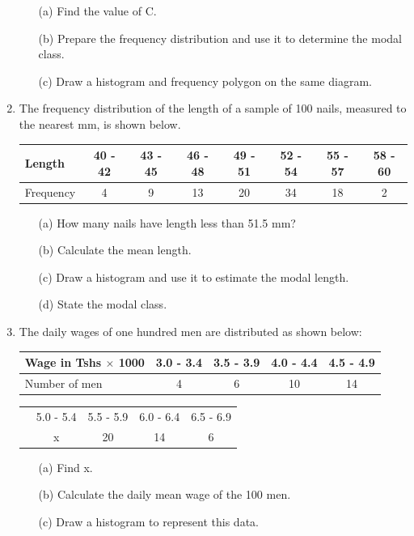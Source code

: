 \begin{enumerate}
	\begin{itemize}
	\item[(a)] Find the value of C.
	\item[(b)] Prepare the frequency distribution and use it to determine the modal class.
	\item[(c)] Draw a histogram and frequency polygon on the same diagram.
	\end{itemize}
	
	\item The frequency distribution of the length of a sample of 100 nails, measured to the nearest mm, is shown below.\\
	
	\begin{tabular}{|l|c|c|c|c|c|c|c|} \hline
	Length&40 - 42&43 - 45&46 - 48&49 - 51&52 - 54&55 - 57&58 - 60 \\ \hline
	Frequency&4&9&13&20&34&18&2 \\ \hline	
	\end{tabular}
	
	\begin{itemize}
	\item[(a)] How many nails have length less than 51.5 mm?
	\item[(b)] Calculate the mean length.
	\item[(c)] Draw a histogram and use it to estimate the modal length.
	\item[(d)] State the modal class.
	\end{itemize} 
	
	\item The daily wages of one hundred men are distributed as shown below:\\
	
	\begin{tabular}{|p{4cm}|c|c|c|c|} \hline
	Wage in Tshs $\times$ 1000&3.0 - 3.4&3.5 - 3.9&4.0 - 4.4&4.5 - 4.9 \\ \hline
	Number of men&4&6&10&14 \\ \hline	
	\end{tabular}
	
	\begin{tabular}{p{4cm}|c|c|c|c|} \cline{2-5}
	&5.0 - 5.4&5.5 - 5.9&6.0 - 6.4&6.5 - 6.9 \\ \cline{2-5}
	&x&20&14&6 \\ \cline{2-5}	
	\end{tabular}
	
	\begin{itemize}
	\item[(a)] Find x.
	\item[(b)] Calculate the daily mean wage of the 100 men.
	\item[(c)] Draw a histogram to represent this data.
	\end{itemize}
	

\end{enumerate}
